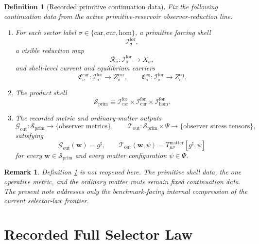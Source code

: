 \documentclass[11pt]{article}
\newcommand{\CompletedMetric}{g^{\sharp}}
\newcommand{\Car}{\mathrm{car}}
\newcommand{\Cur}{\mathrm{cur}}
\newcommand{\Hom}{\mathrm{hom}}
\newcommand{\ForSpace}[1]{\mathcal I_{#1}^{\mathrm{for}}}
\newcommand{\PrimShell}{\mathcal S_{\mathrm{prim}}}
\newcommand{\Reduction}[1]{\mathcal R_{#1}}
\newcommand{\CurrentCarrier}[1]{\mathfrak C_{#1}^{\mathrm{cur}}}
\newcommand{\EqCarrier}[1]{\mathfrak C_{#1}^{\mathrm{eq}}}
\newcommand{\MetricOut}{\mathscr G_{\mathrm{out}}}
\newcommand{\MatterOut}{\mathscr T_{\mathrm{out}}}
\newtheorem{definition}{Definition}
\newtheorem{remark}{Remark}
\begin{document}
\begin{definition}[Recorded primitive continuation data]
\label{def:fixed}
Fix the following continuation data from the active primitive-reservoir observer-reduction line.
\begin{enumerate}
    \item For each sector label \(\sigma\in\{\Car,\Cur,\Hom\}\), a primitive forcing shell
    \[
    \ForSpace{\sigma},
    \]
    a visible reduction map
    \[
    \Reduction{\sigma}:\ForSpace{\sigma}\to X_{\sigma},
    \]
    and shell-level current and equilibrium carriers
    \[
    \CurrentCarrier{\sigma}:\ForSpace{\sigma}\to Z_{\sigma}^{\mathrm{cur}},
    \qquad
    \EqCarrier{\sigma}:\ForSpace{\sigma}\to Z_{\sigma}^{\mathrm{eq}}.
    \]
    \item The product shell
    \[
    \PrimShell
    \equiv
    \ForSpace{\Car}\times \ForSpace{\Cur}\times \ForSpace{\Hom}.
    \]
    \item The recorded metric and ordinary-matter outputs
    \[
    \MetricOut:\PrimShell\to\{\text{observer metrics}\},
    \qquad
    \MatterOut:\PrimShell\times\Psi\to\{\text{observer stress tensors}\},
    \]
    satisfying
    \begin{equation}
    \MetricOut(\mathbf w)=\CompletedMetric,
    \qquad
    \MatterOut(\mathbf w,\psi)
    =
    T_{\mu\nu}^{\mathrm{matter}}[\CompletedMetric,\psi]
    \label{eq:fixedoutputs}
    \end{equation}
    for every \(\mathbf w\in\PrimShell\) and every matter configuration \(\psi\in\Psi\).
\end{enumerate}
\end{definition}

\begin{remark}
Definition \ref{def:fixed} is not reopened here. The primitive shell data, the one operative metric, and the ordinary matter route remain fixed continuation data. The present note addresses only the benchmark-facing internal compression of the current selector-law frontier.
\end{remark}

\section{Recorded Full Selector Law}
\end{document}
